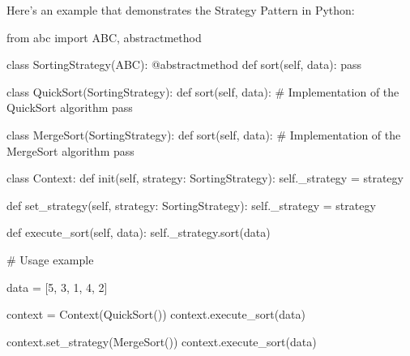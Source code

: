 \documentclass[12pt, a4paper, oneside, justified]{article}
\begin{document}
Here's an example that demonstrates the Strategy Pattern in Python:
\begin{python}
    from abc import ABC, abstractmethod

    class SortingStrategy(ABC):
        @abstractmethod
        def sort(self, data):
            pass

    class QuickSort(SortingStrategy):
        def sort(self, data):
            # Implementation of the QuickSort algorithm
            pass

    class MergeSort(SortingStrategy):
        def sort(self, data):
            # Implementation of the MergeSort algorithm
            pass

    class Context:
        def init(self, strategy: SortingStrategy):
            self._strategy = strategy

        def set_strategy(self, strategy: SortingStrategy):
            self._strategy = strategy

        def execute_sort(self, data):
            self._strategy.sort(data)

    # Usage example

    data = [5, 3, 1, 4, 2]

    context = Context(QuickSort())
    context.execute_sort(data)

    context.set_strategy(MergeSort())
    context.execute_sort(data)
\end{python}
\end{document}
